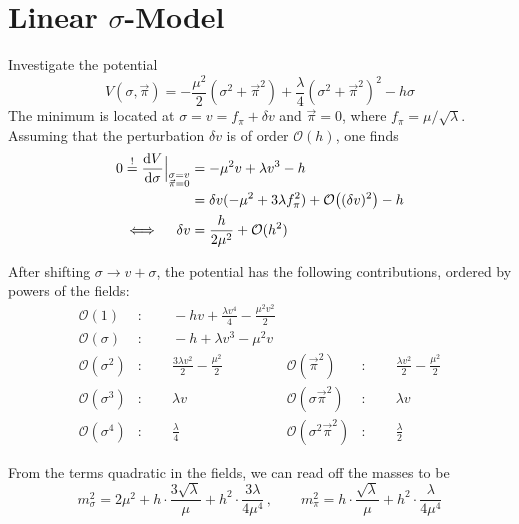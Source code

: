 \section{Linear $\sigma$-Model}
\label{sec:Apx_LinearSigmaExpansion}

Investigate the potential
\begin{equation}
V(\sigma,\vec{\pi})=-\frac{\mu^2}{2}(\sigma^2+\vec{\pi}^2)+\frac{\lambda}{4}(\sigma^2+\vec{\pi}^2)^2-h\sigma
\end{equation}
The minimum is located at ${\sigma= v=f_\pi+\delta v}$ and ${\vec{\pi}=0}$, where ${f_\pi=\mu/\sqrt{\lambda}}$. Assuming that the perturbation ${\delta v}$ is of order ${\mathcal{O}(h)}$, one finds
\begin{subequations}
    \begin{align}
        0\overset{!}{=}\frac{\text{d} V}{\text{d}\sigma}\Big\vert_{\substack{\sigma= v\\\vec{\pi}=0}}&=-\mu^2 v+\lambda v^3-h\\
        &=\delta v(-\mu^2+3\lambda f_\pi^2)+\mathcal{O}\big((\delta v)^2\big)-h\\
        \iff\quad\delta v&=\frac{h}{2\mu^2}+\mathcal{O}(h^2)
    \end{align}
\end{subequations}

After shifting ${\sigma\to v+\sigma}$, the potential has the following contributions, ordered by powers of the fields:
\begin{subequations}
    \begin{align}
        \mathcal{O}(1)&:\qquad-h v+\frac{\lambda  v^4}{4}-\frac{\mu ^2 v^2}{2}\\
        \mathcal{O}(\sigma)&:\qquad-h+\lambda  v^3-\mu ^2 v\\
        \mathcal{O}(\sigma^2)&:\qquad \frac{3 \lambda  v^2}{2}-\frac{\mu ^2}{2}&
        \mathcal{O}(\vec{\pi}^2)&:\qquad \frac{\lambda  v^2}{2}-\frac{\mu ^2}{2}\\
        \mathcal{O}(\sigma^3)&:\qquad \lambda  v&
        \mathcal{O}(\sigma\vec{\pi}^2)&:\qquad \lambda  v\\
        \mathcal{O}(\sigma^4)&:\qquad \frac{\lambda }{4}&
        \mathcal{O}(\sigma^2\vec{\pi}^2)&:\qquad \frac{\lambda }{2}
    \end{align}
\end{subequations}

From the terms quadratic in the fields, we can read off the masses to be
\begin{equation}
    m_\sigma^2=2\mu^2+h\cdot\frac{3\sqrt{\lambda}}{\mu}+h^2\cdot\frac{3\lambda}{4\mu^4}\,,\qquad m_\pi^2=h\cdot\frac{\sqrt{\lambda}}{\mu}+h^2\cdot\frac{\lambda}{4\mu^4}
\end{equation}